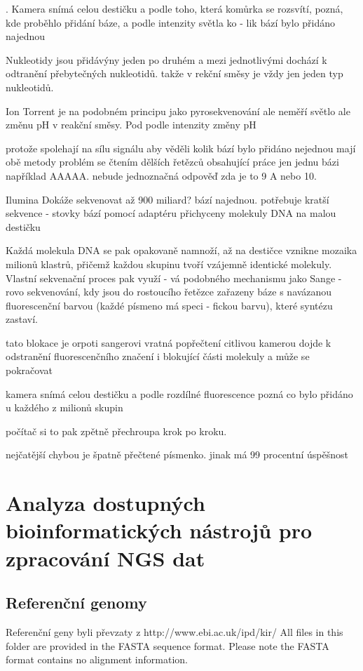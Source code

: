 \documentclass[czech,DP]{thesiskiv}
\begin{document}
. Kamera
snímá celou destičku a podle toho, která
komůrka se rozsvítí, pozná, kde proběhlo
přidání báze, a podle intenzity světla ko -
lik bází bylo přidáno najednou

Nukleotidy jsou přidávýny jeden po druhém a mezi jednotlivými dochází k odtranění přebytečných nukleotidů.
takže v rekční směsy je vždy jen jeden typ nukleotidů.


Ion Torrent je na podobném principu jako pyrosekvenování
ale neměří světlo ale změnu pH v reakční směsy. Pod
podle intenzity změny pH

protože spolehají na sílu signálu aby věděli kolik bází bylo přidáno  nejednou mají obě metody problém se čtením dělších řetězců obsahující práce jen jednu bázi například AAAAA. nebude jednoznačná odpověď zda je to 9 A nebo 10.

Ilumina
Dokáže sekvenovat až 900 miliard? bází najednou. 
potřebuje kratší sekvence - stovky bází
pomocí adaptéru přichyceny molekuly DNA na malou destičku

Každá molekula DNA se pak opakovaně namnoží, až na destičce vznikne
mozaika milionů klastrů, přičemž každou
skupinu tvoří vzájemně identické molekuly. Vlastní sekvenační proces pak využí -
vá podobného mechanismu jako Sange -
rovo sekvenování, kdy jsou do rostoucího
řetězce zařazeny báze s navázanou fluorescenční barvou (každé písmeno má speci -
fickou barvu), které syntézu zastaví.

tato blokace je orpoti sangerovi vratná
 popřečtení citlivou kamerou dojde k odstranění fluorescenčního značení i blokující části molekuly
 a může se pokračovat
 
 kamera snímá celou destičku
 a podle rozdílné fluorescence pozná co bylo přidáno u každého z milionů skupin
 
 počítač si to pak zpětně přechroupa krok po kroku.
 

nejčatější chybou je špatně přečtené písmenko. 
jinak má 99 procentní úspěšnost

\chapter{Analyza dostupných bioinformatických nástrojů pro zpracování NGS dat}
\section{Referenční genomy}
Referenční geny byli převzaty z http://www.ebi.ac.uk/ipd/kir/
All files in this folder are provided in the FASTA sequence format. Please note the FASTA format contains no alignment information.
\end{document}

